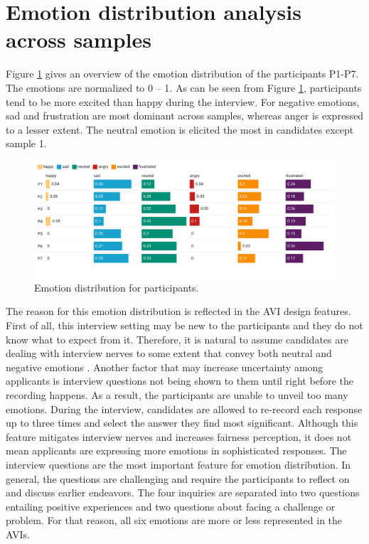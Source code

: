 \section{Emotion distribution analysis across samples}
\label{sec:emotion_distribution_analysis}
Figure \ref{fig:emotion_distribution} gives an overview of the emotion distribution of the participants P1-P7. The emotions are normalized to 0 -- 1. As can be seen from Figure \ref{fig:emotion_distribution}, participants tend to be more excited than happy during the interview. For negative emotions, sad and frustration are most dominant across samples, whereas anger is expressed to a lesser extent. The neutral emotion is elicited the most in candidates except sample 1. 
%
\begin{figure}[h]
  \centering
  \includegraphics[width=\textwidth]{figures/emotion_dist_all.png}
  \caption{Emotion distribution for participants.}
  \label{fig:emotion_distribution}
\end{figure}
%
The reason for this emotion distribution is reflected in the AVI design features. First of all, this interview setting may be new to the participants and they do not know what to expect from it. Therefore, it is natural to assume candidates are dealing with interview nerves to some extent that convey both neutral and negative emotions \cite{interview_anxiety1_powell2018meta}. Another factor that may increase uncertainty among applicants is interview questions not being shown to them until right before the recording happens. As a result, the participants are unable to unveil too many emotions. During the interview, candidates are allowed to re-record each response up to three times and select the answer they find most significant. Although this feature mitigates interview nerves and increases fairness perception, it does not mean applicants are expressing more emotions in sophisticated responses. The interview questions are the most important feature for emotion distribution. In general, the questions are challenging and require the participants to reflect on and discuss earlier endeavors. The four inquiries are separated into two questions entailing positive experiences and two questions about facing a challenge or problem. For that reason, all six emotions are more or less represented in the AVIs. 

